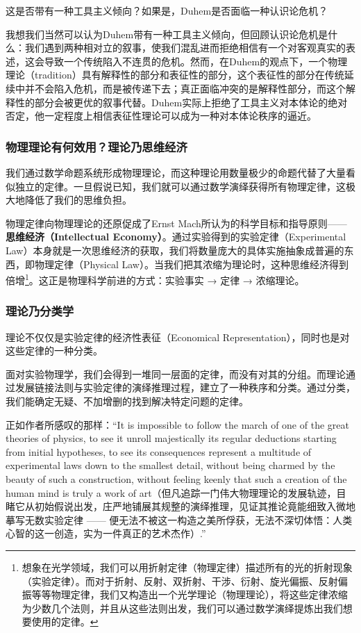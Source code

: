 \documentclass[12pt, a4paper, oneside]{ctexart}
\renewcommand{\b}{\textbf}
\newcommand{\f}{\footnote}
\newcommand{\q}[1]{\begin{questionbox}{}#1\end{questionbox}}
\newcommand{\ans}[1]{\begin{ansbox}{}#1\end{ansbox}}
\newcounter{question}[section]
\newcounter{ans}[section]
\begin{document}
\q{这是否带有一种工具主义倾向？如果是，Duhem是否面临一种认识论危机？}
\ans{我想我们当然可以认为Duhem带有一种工具主义倾向，但回顾认识论危机是什么：我们遇到两种相对立的叙事，使我们混乱进而拒绝相信有一个对客观真实的表述，这会导致一个传统陷入不连贯的危机。然而，在Duhem的观点下，一个物理理论（tradition）具有解释性的部分和表征性的部分，这个表征性的部分在传统延续中并不会陷入危机，而是被传递下去；真正面临冲突的是解释性部分，而这个解释性的部分会被更优的叙事代替。Duhem实际上拒绝了工具主义对本体论的绝对否定，他一定程度上相信表征性理论可以成为一种对本体论秩序的逼近。}

\subsubsection{物理理论有何效用？理论乃思维经济}
我们通过数学命题系统形成物理理论，而这种理论用数量极少的命题代替了大量看似独立的定律。一旦假说已知，我们就可以通过数学演绎获得所有物理定律，这极大地降低了我们的思维负担。

物理定律向物理理论的还原促成了Ernst Mach所认为的科学目标和指导原则——\b{思维经济（Intellectual Economy）}。通过实验得到的实验定律（Experimental Law）本身就是一次思维经济的获取，我们将数量庞大的具体实施抽象成普遍的东西，即物理定律（Physical Law）。当我们把其浓缩为理论时，这种思维经济得到倍增\f{想象在光学领域，我们可以用折射定律（物理定律）描述所有的光的折射现象（实验定律）。而对于折射、反射、双折射、干涉、衍射、旋光偏振、反射偏振等等物理定律，我们又构造出一个光学理论（物理理论），将这些定律浓缩为少数几个法则，并且从这些法则出发，我们可以通过数学演绎提炼出我们想要使用的定律。}。这正是物理科学前进的方式：实验事实 → 定律 → 浓缩理论。

\subsubsection{理论乃分类学}
理论不仅仅是实验定律的经济性表征（Economical Representation），同时也是对这些定律的一种分类。

面对实验物理学，我们会得到一堆同一层面的定律，而没有对其的分组。而理论通过发展链接法则与实验定律的演绎推理过程，建立了一种秩序和分类。通过分类，我们能确定无疑、不加增删的找到解决特定问题的定律。

正如作者所感叹的那样：“It is impossible to follow the march of one of the great theories of physics, to see it unroll majestically its regular deductions starting from initial hypotheses, to see its consequences represent a multitude of experimental laws down to the smallest detail, without being charmed by the beauty of such a construction, without feeling keenly that such a creation of the human mind is truly a work of art（但凡追踪一门伟大物理理论的发展轨迹，目睹它从初始假说出发，庄严地铺展其规整的演绎推理，见证其推论竟能细致入微地摹写无数实验定律 —— 便无法不被这一构造之美所俘获，无法不深切体悟：人类心智的这一创造，实为一件真正的艺术杰作）.”
\end{document}
